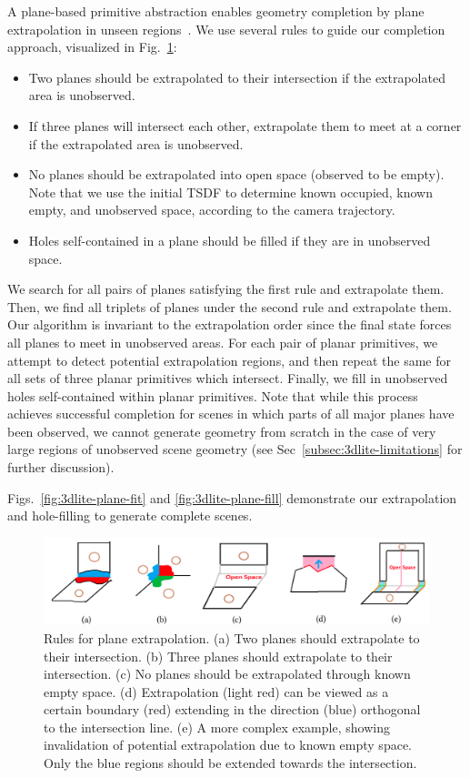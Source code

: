 A plane-based primitive abstraction enables geometry completion by plane extrapolation in unseen regions~\cite{dzitsiuk2016noising}.
We use several rules to guide our completion approach, visualized in Fig.~\ref{fig:3dlite-extrap-illus}:
\begin{itemize}
	\item Two planes should be extrapolated to their intersection if the extrapolated area is unobserved.
	\item If three planes will intersect each other, extrapolate them to meet at a corner if the extrapolated area is unobserved.
	\item No planes should be extrapolated into open space (observed to be empty). Note that we use the initial TSDF to determine known occupied, known empty, and unobserved space, according to the camera trajectory.
	\item Holes self-contained in a plane should be filled if they are in unobserved space.
\end{itemize}

We search for all pairs of planes satisfying the first rule and extrapolate them. 
Then, we find all triplets of planes under the second rule and extrapolate them. 
Our algorithm is invariant to the extrapolation order since the final state forces all planes to meet in unobserved areas.
For each pair of planar primitives, we attempt to detect potential extrapolation regions, and then repeat the same for all sets of three planar primitives which intersect. Finally, we fill in unobserved holes self-contained within planar primitives.
Note that while this process achieves successful completion for scenes in which parts of all major planes have been observed, we cannot generate geometry from scratch in the case of very large regions of unobserved scene geometry (see Sec~\ref{subsec:3dlite-limitations} for further discussion).

Figs.~\ref{fig:3dlite-plane-fit} and \ref{fig:3dlite-plane-fill} demonstrate our extrapolation and hole-filling to generate complete scenes.

\begin{figure}
	\centering
	\includegraphics[width=0.8\linewidth]{3dlite/fig8.png}
	\caption{Rules for plane extrapolation. (a) Two planes should extrapolate to their intersection. (b) Three planes should extrapolate to their intersection. (c) No planes should be extrapolated through known empty space. (d) Extrapolation (light red) can be viewed as a certain boundary (red) extending in the direction (blue) orthogonal to the intersection line. (e) A more complex example, showing invalidation of potential extrapolation due to known empty space. Only the blue regions should be extended towards the intersection.}
	\label{fig:3dlite-extrap-illus}
\end{figure}

